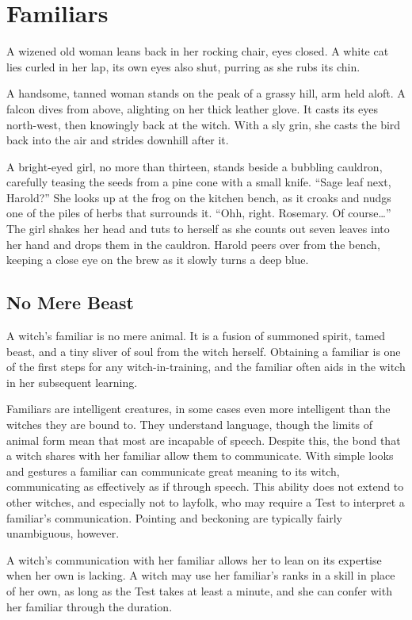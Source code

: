 \chapter{Familiars}

A wizened old woman leans back in her rocking chair, eyes closed.
A white cat lies curled in her lap, its own eyes also shut, purring as she rubs its chin.

A handsome, tanned woman stands on the peak of a grassy hill, arm held aloft.
A falcon dives from above, alighting on her thick leather glove.
It casts its eyes north-west, then knowingly back at the witch.
With a sly grin, she casts the bird back into the air and strides downhill after it.

A bright-eyed girl, no more than thirteen, stands beside a bubbling cauldron, carefully teasing the seeds from a pine cone with a small knife.
``Sage leaf next, Harold?''
She looks up at the frog on the kitchen bench, as it croaks and nudgs one of the piles of herbs that surrounds it.
``Ohh, right. Rosemary. Of course{\dots}''
The girl shakes her head and tuts to herself as she counts out seven leaves into her hand and drops them in the cauldron.
Harold peers over from the bench, keeping a close eye on the brew as it slowly turns a deep blue.

\section{No Mere Beast}

A witch's familiar is no mere animal.
It is a fusion of summoned spirit, tamed beast, and a tiny sliver of soul from the witch herself.
Obtaining a familiar is one of the first steps for any witch-in-training, and the familiar often aids in the witch in her subsequent learning.

Familiars are intelligent creatures, in some cases even more intelligent than the witches they are bound to.
They understand language, though the limits of animal form mean that most are incapable of speech.
Despite this, the bond that a witch shares with her familiar allow them to communicate.
With simple looks and gestures a familiar can communicate great meaning to its witch, communicating as effectively as if through speech.
This ability does not extend to other witches, and especially not to layfolk, who may require a Test to interpret a familiar's communication.
Pointing and beckoning are typically fairly unambiguous, however.

A witch's communication with her familiar allows her to lean on its expertise when her own is lacking.
A witch may use her familiar's ranks in a skill in place of her own, as long as the Test takes at least a minute, and she can confer with her familiar through the duration.

